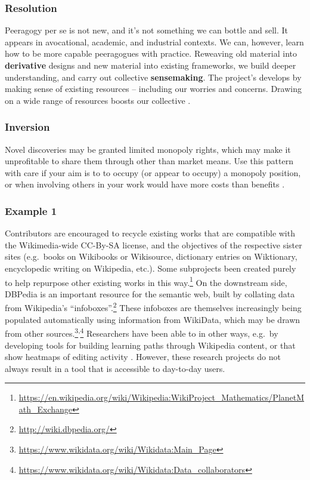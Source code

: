 \subsubsection*{Resolution}  Peeragogy per se is not new, and it's not something we can bottle and sell.  It appears in avocational, academic, and industrial contexts.  We can, however, learn how to be more capable peeragogues with practice.  Reweaving old material into \textbf{derivative} designs and new material into existing frameworks, we build deeper understanding, and carry out collective \textbf{sensemaking}.
%
The project's  develops by making sense of existing resources -- including our worries and concerns.
Drawing on a wide range of resources boosts our collective .

\subsubsection*{Inversion} 
Novel discoveries may be granted limited monopoly rights, which may make it unprofitable to share them through other than market means.  Use this pattern with care if your aim is to to occupy (or appear to occupy) a monopoly position, or when involving others in your work would have more costs than benefits \cite{coase1937nature}.


\subsubsection*{Example 1}
Contributors are encouraged to recycle existing works that are compatible
with the Wikimedia-wide CC-By-SA license, and the objectives of the
respective sister sites (e.g.~books on Wikibooks or Wikisource, dictionary
entries on Wiktionary, encyclopedic writing on Wikipedia, etc.).
Some subprojects been created purely to help repurpose other existing works in this
way.\footnote{\url{https://en.wikipedia.org/wiki/Wikipedia:WikiProject_Mathematics/PlanetMath_Exchange}}
%
On the downstream side, DBPedia is an important resource for the
semantic web, built by collating data from Wikipedia's
``infoboxes''.\footnote{\url{http://wiki.dbpedia.org/}}
%
These infoboxes are themselves increasingly being populated
automatically using information from WikiData, which may be drawn from
other
sources.\footnote{\url{https://www.wikidata.org/wiki/Wikidata:Main_Page}}\textsuperscript{,}\footnote{\url{https://www.wikidata.org/wiki/Wikidata:Data_collaborators}}
Researchers have been able to  in
other ways, e.g.~by developing tools for building learning paths
through Wikipedia content, or that show heatmaps of editing activity \cite{reinhold2006wikitrails,riche2010ichase}.
However, these research projects do not always result in a tool that
is accessible to day-to-day users.

